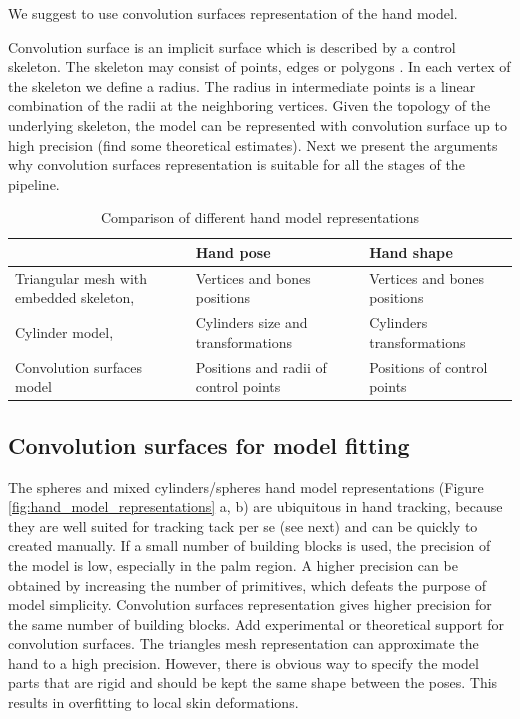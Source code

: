 \documentclass[10pt,journal,a4paper]{IEEEtran}
\begin{document}
We suggest to use convolution surfaces representation of the hand model. 

Convolution surface is an implicit surface which is described by a control skeleton. The skeleton may consist of points, edges or polygons \cite{bloomenthal1991convolution}. In each vertex of the skeleton we define a radius. The radius in intermediate points is a linear combination of the radii at the neighboring vertices. Given the topology of the underlying skeleton, the model can be represented with convolution surface up to high precision \textcolor{mygray}{(find some theoretical estimates).} Next we present the arguments why convolution surfaces representation is suitable for all the stages of the pipeline.

\begin{table}[!h] 
	\centering
	\begin{tabular}{|p{2.5cm}|p{2.5cm}|p{2.5cm}|}
	\hline
 	& Hand pose  & Hand shape  \\
	\hline
	Triangular mesh with embedded skeleton, \cite{taylor2014user} & Vertices and bones positions & Vertices and bones positions	 \\
	\hline
	Cylinder model, \cite{tagliasacchi2015robust} & Cylinders size and transformations & Cylinders transformations	 \\
	\hline
	Convolution surfaces model & Positions and radii of control points & Positions of control points \\
	\hline
	\end{tabular}
	\vspace{1em}
	\caption{Comparison of different hand model representations}
	\label{table:representation_dependent_components}
\end{table}


\subsection{Convolution surfaces for model fitting}
The spheres and mixed cylinders/spheres hand model representations (Figure \ref{fig:hand_model_representations} a, b) are ubiquitous in hand tracking, because they are well suited for tracking tack per se (see next) and can be quickly to created manually. If a small number of  building blocks is used, the precision of the model is low, especially in the palm region. A higher precision can be obtained by increasing the number of primitives, which defeats the purpose of model simplicity. Convolution surfaces representation gives higher precision for the same number of building blocks. \textcolor{mygray}{Add experimental or theoretical support for convolution surfaces.}
The triangles mesh representation can approximate the hand to a high precision. However, there is obvious way to specify the model parts that are rigid and should be kept the same shape between the poses. This results in overfitting to local skin deformations. 
\end{document}

